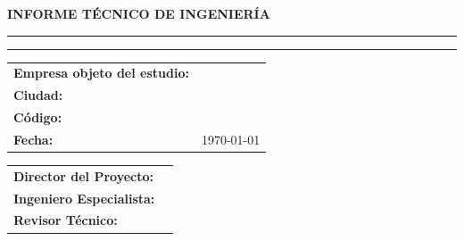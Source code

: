 \begin{titlepage}
	\thispagestyle{corporativo}

	\centering
	\vspace*{1cm}

	{\Large\bfseries INFORME TÉCNICO DE INGENIERÍA}

	\vspace{1cm}
	\rule{\linewidth}{0.4pt}

	\vspace{0.6cm}
	{\huge\bfseries \projecttitle}

	\vspace{0.6cm}
	\rule{\linewidth}{0.4pt}

	\vspace{1cm}

	\begin{table}[h]
		\raggedright
		\begin{tabular}{@{}ll@{}}
			\toprule
			\rowcolor{green!15}
			\textbf{Empresa objeto del estudio:} & \targetcompany \\
			\textbf{Ciudad:} & \projectcity \\
			\textbf{Código:} & \documentcode \\
			\textbf{Fecha:} & \today \\
			\bottomrule
		\end{tabular}
	\end{table}

	\vspace{1cm}

	\begin{table}[h]
		\raggedright
		\begin{tabular}{@{}ll@{}}
			\toprule
			\rowcolor{green!15}
			\textbf{Director del Proyecto:} & \directorProyecto \\
			\textbf{Ingeniero Especialista:} & \ingenieroEspecialista \\
			\textbf{Revisor Técnico:} & \firmaReviso \\
			\bottomrule
		\end{tabular}
	\end{table}

	\vfill


\end{titlepage}
